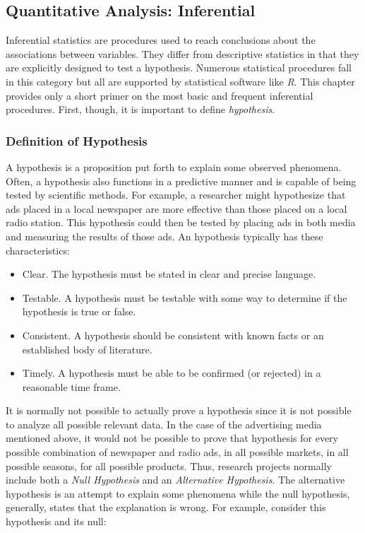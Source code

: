 \subsection{Quantitative Analysis: Inferential}

Inferential statistics are procedures used to reach conclusions about the associations between variables. They differ from descriptive statistics in that they are explicitly designed to test a hypothesis. Numerous statistical procedures fall in this category but all are supported by statistical software like \textit{R}. This chapter provides only a short primer on the most basic and frequent inferential procedures. First, though, it is important to define \textit{hypothesis}.

\subsubsection{Definition of Hypothesis}

A hypothesis is a proposition put forth to explain some observed phenomena. Often, a hypothesis also functions in a predictive manner and is capable of being tested by scientific methods. For example, a researcher might hypothesize that ads placed in a local newspaper are more effective than those placed on a local radio station. This hypothesis could then be tested by placing ads in both media and measuring the results of those ads. An hypothesis typically has these characteristics:

\begin{itemize}
	\item Clear. The hypothesis must be stated in clear and precise language.
	\item Testable. A hypothesis must be testable with some way to determine if the hypothesis is true or false.
	\item Consistent. A hypothesis should be consistent with known facts or an established body of literature.
	\item Timely. A hypothesis must be able to be confirmed (or rejected) in a reasonable time frame.
\end{itemize} 

It is normally not possible to actually prove a hypothesis since it is not possible to analyze all possible relevant data. In the case of the advertising media mentioned above, it would not be possible to prove that hypothesis for every possible combination of newspaper and radio ads, in all possible markets, in all possible seasons, for all possible products. Thus, research projects normally include both a \textit{Null Hypothesis} and an \textit{Alternative Hypothesis}. The alternative hypothesis is an attempt to explain some phenomena while the null hypothesis, generally, states that the explanation is wrong. For example, consider this hypothesis and its null:

